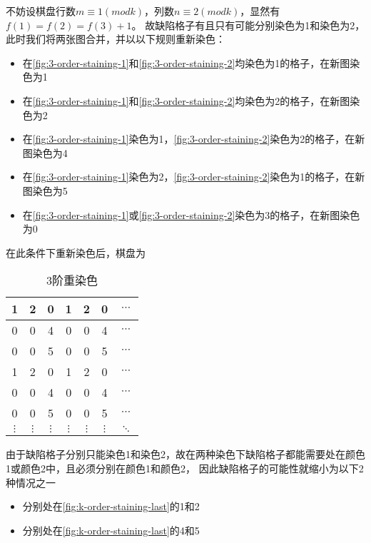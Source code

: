 不妨设棋盘行数$m \equiv 1 (mod k)$，列数$n \equiv 2 (mod k)$，显然有$f(1) = f(2) = f(3) + 1$。
故缺陷格子有且只有可能分别染色为1和染色为2，此时我们将两张图合并，并以以下规则重新染色：
\begin{itemize}
	\item 在\ref*{fig:3-order-staining-1}和\ref*{fig:3-order-staining-2}均染色为1的格子，在新图染色为1
	\item 在\ref*{fig:3-order-staining-1}和\ref*{fig:3-order-staining-2}均染色为2的格子，在新图染色为2
	\item 在\ref*{fig:3-order-staining-1}染色为1，\ref*{fig:3-order-staining-2}染色为2的格子，在新图染色为4
	\item 在\ref*{fig:3-order-staining-1}染色为2，\ref*{fig:3-order-staining-2}染色为1的格子，在新图染色为5
	\item 在\ref*{fig:3-order-staining-1}或\ref*{fig:3-order-staining-2}染色为3的格子，在新图染色为0
\end{itemize}

在此条件下重新染色后，棋盘为

\begin{table}[h]
	\centering
	\caption{3阶重染色}
	\begin{tabular}{|c|c|c|c|c|c|c|}
		\hline
		1        & 2        & 0        & 1        & 2        & 0        & $\cdots$ \\
		\hline
		0        & 0        & 4        & 0        & 0        & 4        & $\cdots$ \\
		\hline
		0        & 0        & 5        & 0        & 0        & 5        & $\cdots$ \\
		\hline
		1        & 2        & 0        & 1        & 2        & 0        & $\cdots$ \\
		\hline
		0        & 0        & 4        & 0        & 0        & 4        & $\cdots$ \\
		\hline
		0        & 0        & 5        & 0        & 0        & 5        & $\cdots$ \\
		\hline
		$\vdots$ & $\vdots$ & $\vdots$ & $\vdots$ & $\vdots$ & $\vdots$ & $\ddots$ \\
		\hline
	\end{tabular}
	\label{fig:3-order-staining-last}
\end{table}

由于缺陷格子分别只能染色1和染色2，故在两种染色下缺陷格子都能需要处在颜色1或颜色2中，且必须分别在颜色1和颜色2，
因此缺陷格子的可能性就缩小为以下2种情况之一
\begin{itemize}
	\item 分别处在\ref*{fig:k-order-staining-last}的1和2
	\item 分别处在\ref*{fig:k-order-staining-last}的4和5
\end{itemize}

